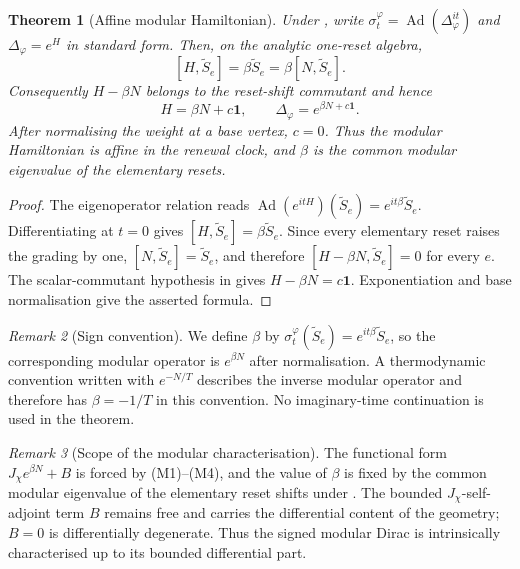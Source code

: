 \documentclass[11pt]{article}
\newtheorem{theorem}{Theorem}[section]
\theoremstyle{definition}
\theoremstyle{remark}
\newtheorem{remark}[theorem]{Remark}
\newcommand{\one}{\mathbf{1}}
\newcommand{\Jchi}{J_\chi}
\newcommand{\Stilde}{\widetilde{S}}
\begin{document}
\begin{theorem}[Affine modular Hamiltonian]
\label{thm:affine-modular}
Under , write
\(\sigma_t^\varphi=\operatorname{Ad}(\Delta_\varphi^{it})\) and
\(\Delta_\varphi=e^H\) in standard form.  Then, on the analytic one-reset
algebra,
\[
  [H,\Stilde_e]=\beta\Stilde_e=\beta[N,\Stilde_e].
\]
Consequently \(H-\beta N\) belongs to the reset-shift commutant and hence
\[
  \boxed{\ H=\beta N+c\one,\qquad
  \Delta_\varphi=e^{\beta N+c\one}.\ }
\]
After normalising the weight at a base vertex, \(c=0\).  Thus the modular
Hamiltonian is affine in the renewal clock, and \(\beta\) is the common modular
eigenvalue of the elementary resets.
\end{theorem}

\begin{proof}
The eigenoperator relation reads
\(\operatorname{Ad}(e^{itH})(\Stilde_e)=e^{it\beta}\Stilde_e\).  Differentiating
at \(t=0\) gives \([H,\Stilde_e]=\beta\Stilde_e\).  Since every elementary reset
raises the grading by one, \([N,\Stilde_e]=\Stilde_e\), and therefore
\([H-\beta N,\Stilde_e]=0\) for every \(e\).  The scalar-commutant hypothesis in
 gives \(H-\beta N=c\one\).  Exponentiation and base
normalisation give the asserted formula.
\end{proof}

\begin{remark}[Sign convention]
\label{rem:modular-sign-convention}
We define \(\beta\) by
\(\sigma_t^\varphi(\Stilde_e)=e^{it\beta}\Stilde_e\), so the corresponding
modular operator is \(e^{\beta N}\) after normalisation.  A thermodynamic
convention written with \(e^{-N/T}\) describes the inverse modular operator and
therefore has \(\beta=-1/T\) in this convention.  No imaginary-time continuation
is used in the theorem.
\end{remark}

\begin{remark}[Scope of the modular characterisation]
\label{rem:cviii-status}
The functional form $\Jchi e^{\beta N}+B$ is forced by (M1)--(M4), and the
value of $\beta$ is fixed by the common modular eigenvalue of the elementary
reset shifts under .  The bounded
$\Jchi$-self-adjoint term $B$ remains free and carries the differential content
of the geometry; $B=0$ is differentially degenerate.  Thus the signed modular
Dirac is intrinsically characterised up to its bounded differential part.
\end{remark}
\end{document}
